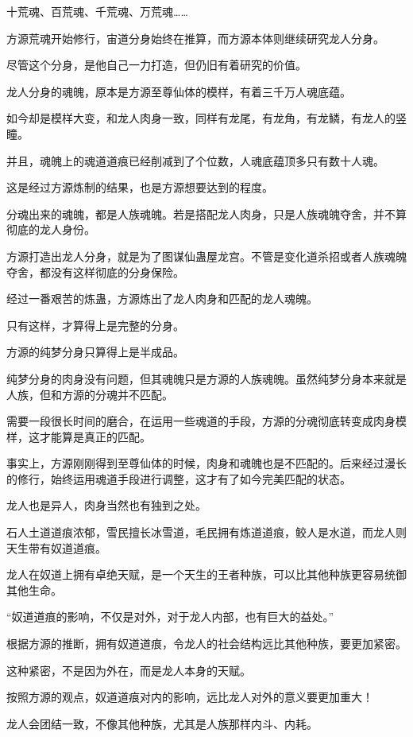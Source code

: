 \begin{this_body}
十荒魂、百荒魂、千荒魂、万荒魂……

方源荒魂开始修行，宙道分身始终在推算，而方源本体则继续研究龙人分身。

尽管这个分身，是他自己一力打造，但仍旧有着研究的价值。

龙人分身的魂魄，原本是方源至尊仙体的模样，有着三千万人魂底蕴。

如今却是模样大变，和龙人肉身一致，同样有龙尾，有龙角，有龙鳞，有龙人的竖瞳。

并且，魂魄上的魂道道痕已经削减到了个位数，人魂底蕴顶多只有数十人魂。

这是经过方源炼制的结果，也是方源想要达到的程度。

分魂出来的魂魄，都是人族魂魄。若是搭配龙人肉身，只是人族魂魄夺舍，并不算彻底的龙人身份。

方源打造出龙人分身，就是为了图谋仙蛊屋龙宫。不管是变化道杀招或者人族魂魄夺舍，都没有这样彻底的分身保险。

经过一番艰苦的炼蛊，方源炼出了龙人肉身和匹配的龙人魂魄。

只有这样，才算得上是完整的分身。

方源的纯梦分身只算得上是半成品。

纯梦分身的肉身没有问题，但其魂魄只是方源的人族魂魄。虽然纯梦分身本来就是人族，但和方源的分魂并不匹配。

需要一段很长时间的磨合，在运用一些魂道的手段，方源的分魂彻底转变成肉身模样，这才能算是真正的匹配。

事实上，方源刚刚得到至尊仙体的时候，肉身和魂魄也是不匹配的。后来经过漫长的修行，始终运用魂道手段进行调整，这才有了如今完美匹配的状态。

龙人也是异人，肉身当然也有独到之处。

石人土道道痕浓郁，雪民擅长冰雪道，毛民拥有炼道道痕，鲛人是水道，而龙人则天生带有奴道道痕。

龙人在奴道上拥有卓绝天赋，是一个天生的王者种族，可以比其他种族更容易统御其他生命。

“奴道道痕的影响，不仅是对外，对于龙人内部，也有巨大的益处。”

根据方源的推断，拥有奴道道痕，令龙人的社会结构远比其他种族，要更加紧密。

这种紧密，不是因为外在，而是龙人本身的天赋。

按照方源的观点，奴道道痕对内的影响，远比龙人对外的意义要更加重大！

龙人会团结一致，不像其他种族，尤其是人族那样内斗、内耗。


\end{this_body}
